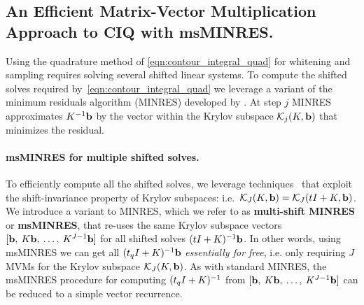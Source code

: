 \subsection{An Efficient Matrix-Vector Multiplication Approach to CIQ with msMINRES.}
%
Using the quadrature method of \cref{eqn:contour_integral_quad} for whitening and sampling requires solving several shifted linear systems.
To compute the shifted solves required by~\cref{eqn:contour_integral_quad} we leverage a variant of the
minimum residuals algorithm (MINRES) developed by \citet{paige1975solution}. At step $j$
MINRES approximates $K^{-1} \mathbf{b}$ by the vector within the Krylov subspace $\mathcal{K}_j(K, \mathbf{b})$ that minimizes the residual.

\paragraph{msMINRES for multiple shifted solves.}
To efficiently compute all the shifted solves, we leverage techniques~\citep[e.g.][]{datta1991arnoldi,freund1990conjugate,meerbergen2003solution} that exploit the shift-invariance property of Krylov subspaces: i.e.~$\mathcal{K}_J(K, \mathbf{b}) = \mathcal{K}_J(t I +  K, \mathbf{b})$.
We introduce a variant to MINRES, which we refer to as {\bf multi-shift MINRES} or {\bf msMINRES}, that re-uses the same Krylov subspace vectors $[\mathbf{b}, \: K \mathbf{b}, \: \ldots, \: K^{J-1} \mathbf{b}]$ for all shifted solves $(t I + K)^{-1} \mathbf{b}$.
In other words, using msMINRES we can get all $(t_q I + K)^{-1} \mathbf{b}$ \emph{essentially for free}, i.e. only requiring $J$ MVMs for the Krylov subspace $\mathcal{K}_J(K, \mathbf{b})$.
As with standard MINRES, the msMINRES procedure for computing $(t_q I + K)^{-1}$ from $[\mathbf{b}, \: K \mathbf{b}, \: \ldots, \: K^{J-1} \mathbf{b}]$ can be reduced to a simple vector recurrence.

